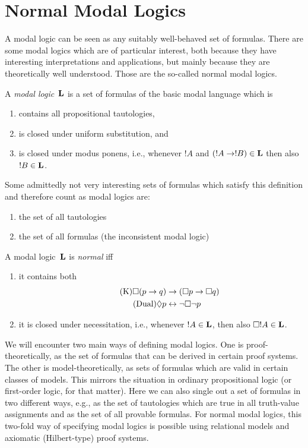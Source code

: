 \documentclass[modal-logic]{subfiles}
\begin{document}
\section{Normal Modal Logics}

A modal logic can be seen as any suitably well-behaved set of formulas.  There are some modal logics which are of particular interest, both because they have interesting interpretations and applications, but mainly because they are theoretically well understood.  Those are the so-called normal modal logics.  

\begin{defn}\label{defn:modal-logic}
A \emph{modal logic}~$\mathbf L$ is a set of formulas of the basic modal language which is
\begin{enumerate}
\item contains all propositional tautologies, 
\item is closed under uniform substitution, and 
\item is closed under modus ponens, i.e., whenever $!A$ and $(!A \to !B) \in \mathbf L$ then also $!B \in \mathbf L$.
\end{enumerate}
\end{defn}

\begin{ex}
Some admittedly not very interesting sets of formulas which satisfy this definition and therefore count as modal logics are:
\begin{enumerate}
\item the set of all tautologies
\item the set of all formulas (the inconsistent modal logic)
\end{enumerate}
\end{ex}

\begin{defn}\label{defn:normal-modal-logic}
A modal logic~$\mathbf L$ is \emph{normal} iff 
\begin{enumerate}
\item it contains both
\begin{align}
\tag{K} \Box(p \to q) & \to (\Box p \to \Box q) \\
\tag{Dual} \Diamond p & \leftrightarrow \lnot \Box \lnot p
\end{align}
\item it is closed under necessitation, i.e., whenever $!A \in \mathbf L$, then also $\Box !A \in \mathbf L$.
\end{enumerate}
\end{defn}

We will encounter two main ways of defining modal logics.  One is proof-theoretically, as the set of formulas that can be derived in certain proof systems. The other is model-theoretically, as sets of formulas which are valid in certain classes of models. This mirrors the situation in ordinary propositional logic (or first-order logic, for that matter).  Here we can also single out a set of formulas in two different ways, e.g., as the set of tautologies which are true in all truth-value assignments and as the set of all provable formulas.  For normal modal logics, this two-fold way of specifying modal logics is possible using relational models and axiomatic (Hilbert-type) proof systems.
\end{document}
